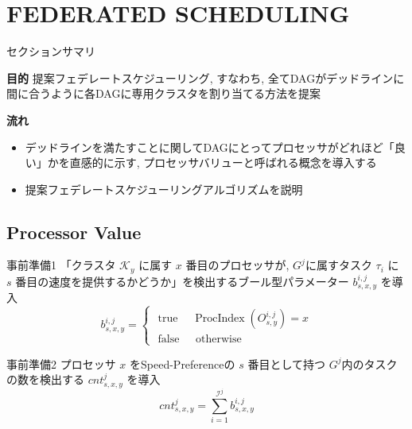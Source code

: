 
\section{FEDERATED SCHEDULING}
\label{sec: FEDERATED SCHEDULING}

\begin{frame}{セクションサマリ}
    \begin{itembox}[l]{\textbf{目的}}
        提案フェデレートスケジューリング, すなわち, 全てDAGがデッドラインに間に合うように各DAGに専用クラスタを割り当てる方法を提案
    \end{itembox}
    \begin{itembox}[l]{\textbf{流れ}}
        \setlength{\linewidth}{0.98\columnwidth}
        \begin{itemize}
            \item デッドラインを満たすことに関してDAGにとってプロセッサがどれほど「良い」かを直感的に示す, プロセッサバリューと呼ばれる概念を導入する
            \item 提案フェデレートスケジューリングアルゴリズムを説明
        \end{itemize}
    \end{itembox}
\end{frame}


\subsection{Processor Value}
\label{ssec: Processor Value}

\begin{frame}{事前準備1}
    「クラスタ $\mathcal{K}_y$ に属す $x$ 番目のプロセッサが, $G^j$に属すタスク $\tau_i$ に $s$ 番目の速度を提供するかどうか」を検出するブール型パラメーター $b_{s,x,y}^{i,j}$ を導入
    \begin{equation*}
        b_{s, x, y}^{i, j}= \begin{cases}\text { true } & \operatorname{ProcIndex}\left(O_{s, y}^{i, j}\right)=x \\ \text { false } & \text { otherwise }\end{cases}
    \end{equation*}
\end{frame}

\begin{frame}{事前準備2}
    プロセッサ $x$ をSpeed-Preferenceの $s$ 番目として持つ $G^j$内のタスクの数を検出する $cnt_{s,x,y}^j$ を導入
    \begin{equation*}
        c n t_{s, x, y}^j=\sum_{i=1}^{\mathcal{I}^j} b_{s, x, y}^{i, j}
    \end{equation*}
\end{frame}

